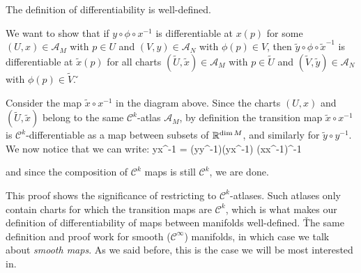 \bt[]
The definition of differentiability is well-defined.
\et

\bq
We want to show that if $y\circ\phi\circ x^{-1}$ is differentiable at $x(p)$ for some $(U,x)\in\mathscr{A}_M$ with
$p\in U$ and $(V,y)\in\mathscr{A}_N$ with $\phi(p)\in V$, then $\widetilde y\circ\phi\circ \widetilde x^{-1}$ is
differentiable at $\widetilde x(p)$ for all charts $(\widetilde U,\widetilde x)\in\mathscr{A}_M$ with $p\in
\widetilde U$ and $(\widetilde V,\widetilde y)\in\mathscr{A}_N$ with $\phi(p)\in \widetilde V$. \v

\bse
{}
\ese

\vspace{10pt}

Consider the map $\widetilde x\circ x^{-1}$ in the diagram above. Since the charts $(U,x)$ and $(\widetilde U,
\widetilde x)$ belong to the same $\mathcal{C}^k$-atlas $\mathscr{A}_M$, by definition the transition map $\widetilde
x\circ x^{-1}$ is $\mathcal{C}^k$-differentiable as a map between subsets of $\mathbb{R}^{\dim M}$, and similarly for
$\widetilde y\circ y^{-1}$. We now notice that we can write:
\bse
\widetilde y\circ\phi\circ \widetilde x^{-1} = (\widetilde y\circ y^{-1})\circ(y\circ\phi\circ x^{-1})\circ
(\widetilde x\circ x^{-1})^{-1}
\ese

and since the composition of $\mathcal{C}^k$ maps is still $\mathcal{C}^k$, we are done.
\eq

This proof shows the significance of restricting to $\mathcal{C}^k$-atlases. Such atlases only contain charts for
which the transition maps are $\mathcal{C}^k$, which is what makes our definition of differentiability of maps
between manifolds well-defined. \v

The same definition and proof work for smooth ($\mathcal{C}^\infty$) manifolds, in which case we talk about
\emph{smooth maps}. As we said before, this is the case we will be most interested in.

